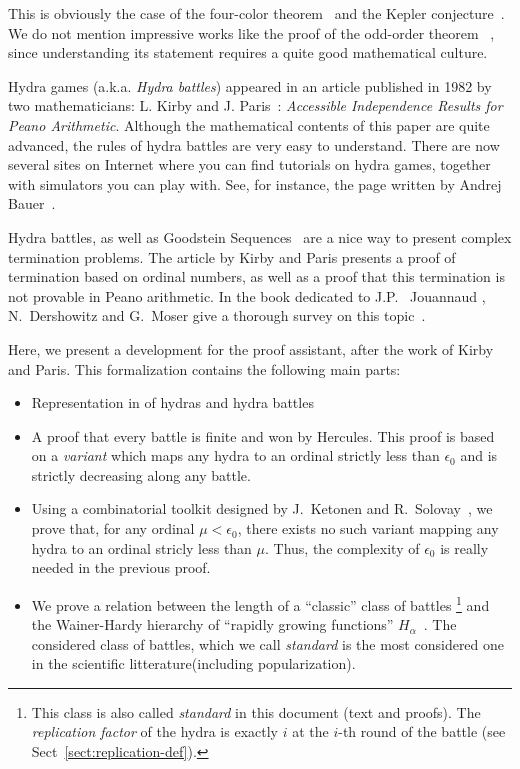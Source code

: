 \documentclass[a4paper]{book}
\begin{document}
This is obviously the case of the four-color theorem~\cite{fourcolors}  and the Kepler conjecture~\cite{flyspeck2015}. We do not mention impressive works like the proof of the odd-order theorem ~\cite{oddorderthm}, since understanding its statement requires a quite good mathematical culture.




Hydra games (a.k.a. \emph{Hydra battles}) appeared in an article published in 1982 by two mathematicians:
L. Kirby and J. Paris~\cite{KP82}: \emph{Accessible Independence Results for Peano Arithmetic}. 
Although the mathematical contents of this 
paper are quite advanced, the rules of hydra battles are very easy to understand. There are now several sites on Internet where you can find tutorials on hydra games, together with simulators you can play with. See, for instance, the page written by Andrej Bauer~\cite{bauer2008}.



Hydra battles, as well as Goodstein Sequences~\cite{goodstein_1944, KP82}
are a nice way to present complex termination problems.
The article by Kirby and Paris presents a proof of termination
based on ordinal numbers, as well as a proof that this termination is not
provable in Peano arithmetic. In the book dedicated to 
J.P. ~Jouannaud \cite{HommageJPJ}, N.~Dershowitz and G.~Moser  give a thorough survey on this topic~\cite{Dershowitz2007}.



Here, we present a development  for the \coq{} proof assistant, after the work of Kirby and Paris. This formalization contains the following main parts:

\begin{itemize}
\item Representation in \coq{} of hydras and hydra battles
\item A proof that every battle is finite and won by Hercules. This proof is based on a \emph{variant} which maps any hydra to an ordinal strictly less than $\epsilon_0$ and is strictly decreasing along any battle.

\item Using a combinatorial toolkit designed by J.~Ketonen and R.~Solovay~\cite{KS81}, we prove that, for any ordinal $\mu<\epsilon_0$, there exists no such variant mapping any hydra to an ordinal stricly less than $\mu$. Thus, the complexity of $\epsilon_0$ is really needed in the previous proof.

\item We prove a relation between the length of a ``classic''  class of  battles \footnote{This class is also called \emph{standard} in this document (text and proofs). The \emph{replication factor} of the hydra is exactly $i$ at the $i$-th round of the battle (see Sect~\vref{sect:replication-def}).}
and the Wainer-Hardy hierarchy of ``rapidly growing functions'' $H_\alpha$~\cite{Wainer1970}. The considered class of battles, which we call \emph{standard}  is the most considered one in the scientific  litterature(including popularization).
\end{itemize}
\end{document}
